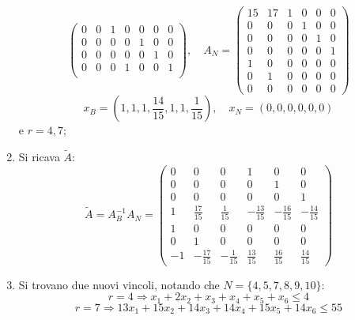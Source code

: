 \documentclass[a4paper,11pt]{article}
\begin{document}
\begin{enumerate}
$$\begin{pmatrix}
		0 & 0 & 1 & 0 & 0 & 0 & 0 \\
		0 & 0 & 0 & 0 & 1 & 0 & 0 \\
		0 & 0 & 0 & 0 & 0 & 1 & 0 \\
		0 & 0 & 0 & 1 & 0 & 0 & 1 \\
	\end{pmatrix}, \quad 
	A_N = 
	\begin{pmatrix}
		15 & 17 & 1 & 0 & 0 & 0 \\ 
		0 & 0 & 0 & 1 & 0 & 0 \\ 
		0 & 0 & 0 & 0 & 1 & 0 \\ 
		0 & 0 & 0 & 0 & 0 & 1 \\ 
		1 & 0 & 0 & 0 & 0 & 0 \\ 
		0 & 1 & 0 & 0 & 0 & 0 \\
		0 & 0 & 0 & 0 & 0 & 0
	\end{pmatrix}
	$$
	$$
	x_B =
	\left(
		1, 1, 1, \frac{14}{15}, 1, 1, \frac{1}{15}
	\right), \quad 
	x_N = 
	\left(
		0, 0, 0, 0, 0, 0
	\right)
	$$
	e $r= 4, 7$;
\item Si ricava $\tilde{A}$:
	$$
	\tilde{A} = A_B^{-1} A_N = 
	\begin{pmatrix}
		0 & 0 & 0 & 1 & 0 & 0 \\ 
		0 & 0 & 0 & 0 & 1 & 0 \\ 
		0 & 0 & 0 & 0 & 0 & 1 \\ 
		1 & \frac{17}{15} & \frac{1}{15} & -\frac{13}{15} & -\frac{16}{15} & -\frac{14}{15} \\ 
		1 & 0 & 0 & 0 & 0 & 0 \\ 
		0 & 1 & 0 & 0 & 0 & 0 \\ 
		-1 & -\frac{17}{15} & -\frac{1}{15} & \frac{13}{15} & \frac{16}{15} & \frac{14}{15}
	\end{pmatrix} 
	$$
\item Si trovano due nuovi vincoli, notando che $N = \{ 4, 5, 7, 8, 9, 10 \}$:
$$
r=4 \Rightarrow x_1 + 2x_2 + x_3 + x_4 + x_5 + x_6 \leq 4 
$$
$$
r=7 \Rightarrow 13 x_1 + 15 x_2 + 14 x_3 + 14 x_4 + 15 x_5 + 14 x_6 \leq 55
$$
\end{enumerate}
\end{document}
